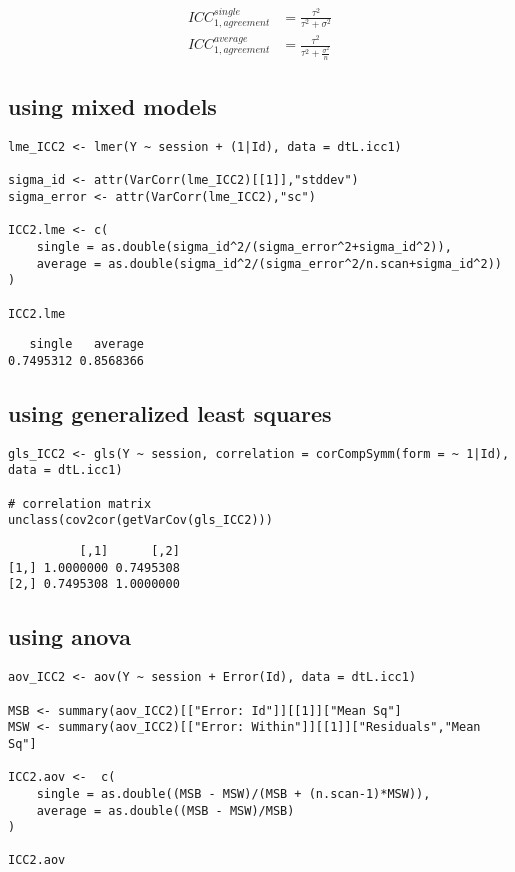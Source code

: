 \documentclass{article}
\begin{document}
\begin{align}
 ICC^{single}_{1,agreement} &= \frac{\tau^2}{\tau^2 + \sigma^2} \\
 ICC^{average}_{1,agreement} &= \frac{\tau^2}{\tau^2 + \frac{\sigma^2}{n}}
\end{align}

\clearpage

\subsection{using mixed models}
\label{sec:orgc38faac}
\lstset{language=r,label= ,caption= ,captionpos=b,numbers=none}
\begin{lstlisting}
lme_ICC2 <- lmer(Y ~ session + (1|Id), data = dtL.icc1)

sigma_id <- attr(VarCorr(lme_ICC2)[[1]],"stddev")
sigma_error <- attr(VarCorr(lme_ICC2),"sc")

ICC2.lme <- c(
    single = as.double(sigma_id^2/(sigma_error^2+sigma_id^2)),
    average = as.double(sigma_id^2/(sigma_error^2/n.scan+sigma_id^2))
)

ICC2.lme
\end{lstlisting}

\begin{verbatim}
   single   average 
0.7495312 0.8568366
\end{verbatim}

\bigskip

\subsection{using generalized least squares}
\label{sec:org1599827}
\lstset{language=r,label= ,caption= ,captionpos=b,numbers=none}
\begin{lstlisting}
gls_ICC2 <- gls(Y ~ session, correlation = corCompSymm(form = ~ 1|Id), data = dtL.icc1)

# correlation matrix
unclass(cov2cor(getVarCov(gls_ICC2)))
\end{lstlisting}

\begin{verbatim}
          [,1]      [,2]
[1,] 1.0000000 0.7495308
[2,] 0.7495308 1.0000000
\end{verbatim}

\bigskip

\subsection{using anova}
\label{sec:orge56c6fd}
\lstset{language=r,label= ,caption= ,captionpos=b,numbers=none}
\begin{lstlisting}
aov_ICC2 <- aov(Y ~ session + Error(Id), data = dtL.icc1) 

MSB <- summary(aov_ICC2)[["Error: Id"]][[1]]["Mean Sq"]
MSW <- summary(aov_ICC2)[["Error: Within"]][[1]]["Residuals","Mean Sq"]

ICC2.aov <-  c(
    single = as.double((MSB - MSW)/(MSB + (n.scan-1)*MSW)),
    average = as.double((MSB - MSW)/MSB)
)

ICC2.aov
\end{lstlisting}
\end{document}
